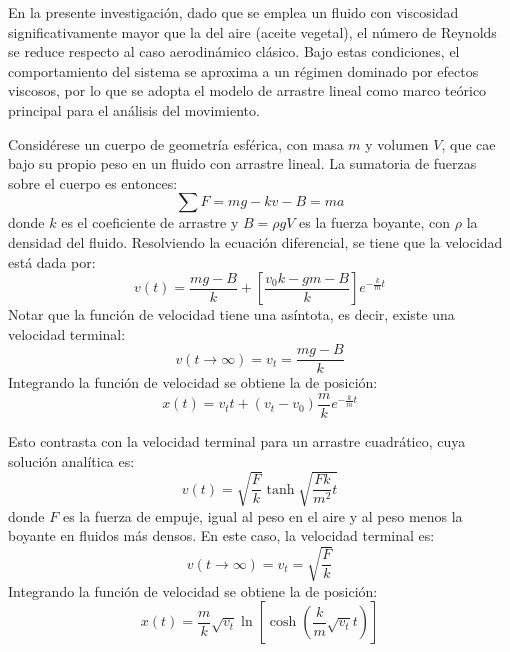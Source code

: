\documentclass[12pt,a4paper]{config/myConfig}
\begin{document}
En la presente investigación, dado que se emplea un fluido con viscosidad significativamente mayor que la del aire (aceite vegetal), el número de Reynolds se reduce respecto al caso aerodinámico clásico. Bajo estas condiciones, el comportamiento del sistema se aproxima a un régimen dominado por efectos viscosos, por lo que se adopta el modelo de arrastre lineal como marco teórico principal para el análisis del movimiento. \citet{Saldania2024The}

Considérese un cuerpo de geometría esférica, con masa $m$ y volumen $V$, que cae
bajo su propio peso en un fluido con arrastre lineal. La sumatoria de fuerzas
sobre el cuerpo es entonces:
\begin{equation*}
    \sum F = mg - kv-B = ma
\end{equation*}
donde $k$ es el coeficiente de arrastre y $B=\rho g V$ es la fuerza boyante,
con $\rho$ la densidad del fluido. Resolviendo la ecuación diferencial, se tiene que la velocidad está dada por:
\begin{equation}
    v(t) = \frac{mg-B}{k}+\left[ \frac{v_0k-gm-B}{k} \right]e^{-\frac{k}{m}t} \tag{Velocidad en función del tiempo}
\end{equation}
Notar que la función de velocidad tiene una asíntota, es decir, existe una velocidad terminal: 
\begin{equation}
    v(t\rightarrow \infty) = v_t=\frac{mg-B}{k} \tag{Velocidad terminal} 
\end{equation}
Integrando la función de velocidad se obtiene la de posición: 
\begin{equation}
    x(t) = v_tt + (v_t-v_0)\frac{m}{k}e^{-\frac{k}{m}t} \tag{Posición en función del tiempo} \label{eq:x-t}
\end{equation}

Esto contrasta con la velocidad terminal para un arrastre cuadrático, cuya solución analítica es:
\begin{equation}
    v(t) = \sqrt{\frac{F}{k}}\tanh { \sqrt{\frac{Fk}{m^2}t} } \tag{Velocidad en función del tiempo}
\end{equation}
donde $F$ es la fuerza de empuje, igual al peso en el aire y 
al peso menos la boyante en fluidos más densos. En este caso, la velocidad terminal es: 
\begin{equation}
    v(t\rightarrow \infty) = v_t=\sqrt{\frac{F}{k}} \tag{Velocidad terminal} 
\end{equation}
Integrando la función de velocidad se obtiene la de posición: 
\begin{equation}
    x(t) = \frac{m}{k} \sqrt{v_t} \ln \left[ \cosh(\frac{k}{m}\sqrt{v_t} t) \right] \tag{Posición en función del tiempo}
\end{equation}
\end{document}
